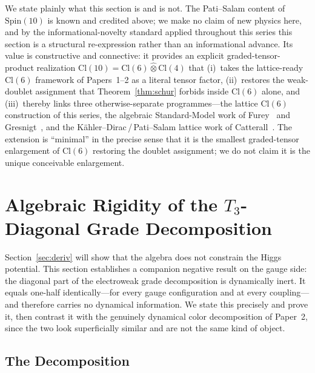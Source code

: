 \documentclass[12pt]{article}
\theoremstyle{remark}
\newcommand{\cl}{\mathrm{Cl}}
\newcommand{\spin}{\mathrm{Spin}}
\newcommand{\grtensor}{\mathbin{\widehat{\otimes}}}  %
\begin{document}
We state plainly what this section is and is not.  The Pati--Salam content of
$\spin(10)$ is known and credited above; we make no claim of new physics here,
and by the informational-novelty standard applied throughout this series this
section is a structural re-expression rather than an informational advance.  Its
value is constructive and connective: it provides an explicit graded-tensor-
product realization $\cl(10)=\cl(6)\grtensor\cl(4)$ that (i)~takes the
lattice-ready $\cl(6)$ framework of Papers~1--2 as a literal tensor factor,
(ii)~restores the weak-doublet assignment that Theorem~\ref{thm:schur} forbids
inside $\cl(6)$ alone, and (iii)~thereby links three otherwise-separate
programmes---the lattice $\cl(6)$ construction of this series, the algebraic
Standard-Model work of Furey~\cite{Furey2018a,Furey2018b} and
Gresnigt~\cite{Gresnigt2020}, and the K\"ahler--Dirac\,/\,Pati--Salam lattice
work of Catterall~\cite{Catterall2023,Catterall2024}.  The extension is ``minimal'' in the
precise sense that it is the smallest graded-tensor enlargement of $\cl(6)$
restoring the doublet assignment; we do not claim it is the unique conceivable
enlargement.

\section{Algebraic Rigidity of the
	\texorpdfstring{$T_3$}{T3}-Diagonal Grade Decomposition}
\label{sec:rigidity}

Section~\ref{sec:deriv} will show that the algebra does not constrain the Higgs
potential.  This section establishes a companion negative result on the gauge
side: the diagonal part of the electroweak grade decomposition is dynamically
inert.  It equals one-half identically---for every gauge configuration and at
every coupling---and therefore carries no dynamical information.  We state this
precisely and prove it, then contrast it with the genuinely dynamical color
decomposition of Paper~2, since the two look superficially similar and are not
the same kind of object.

\subsection{The Decomposition}
\label{sec:rigidity-decomp}
\end{document}
